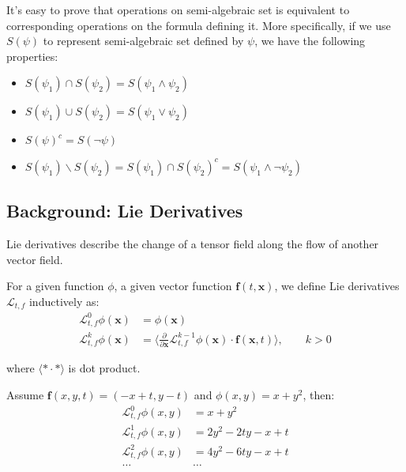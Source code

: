 \documentclass{jssc}
\begin{document}
It's easy to prove that operations on semi-algebraic set is equivalent to corresponding operations on the formula defining it. More specifically, if we use $S(\psi)$ to represent semi-algebraic set defined by $\psi$, we have the following properties:
\begin{itemize}
	\item $S(\psi_1) \cap S(\psi_2) = S(\psi_1 \wedge \psi_2)$
	\item $S(\psi_1) \cup S(\psi_2) = S(\psi_1 \vee \psi_2)$
	\item $S(\psi)^c = S(\neg \psi)$
	\item $S(\psi_1) \backslash S(\psi_2) = S(\psi_1) \cap S(\psi_2)^c = S(\psi_1 \wedge \neg \psi_2)$
\end{itemize}

\subsection{Background: Lie Derivatives}
Lie derivatives describe the change of a tensor field along the flow of another vector field.

\begin{definition}
\label{def:lieDeri}
For a given function $\phi$, a given vector function $\boldsymbol{f}(t, \boldsymbol{x})$, we define Lie derivatives $\mathcal{L}_{t, f}$ inductively as:
\begin{align*}
	\mathcal{L}_{t, f}^0 \phi (\boldsymbol{x}) &= \phi (\boldsymbol{x}) \\
	\mathcal{L}_{t, f}^k \phi (\boldsymbol{x}) &= \langle \frac{\partial}{\partial \boldsymbol{x}} \mathcal{L}_{t, f}^{k-1} \phi (\boldsymbol{x}) \cdot  \boldsymbol{f}(\boldsymbol{x}, t) \rangle,\qquad k>0
\end{align*}

where $\langle * \cdot * \rangle$ is dot product.
\end{definition}

\begin{example}
	Assume $\boldsymbol{f}(x,y,t) = (-x+t,y-t)$ and $\phi (x,y) = x + y^2$, then:
	\begin{align*}
		\mathcal{L}_{t, f}^0 \phi (x, y) &= x + y^2 \\
		\mathcal{L}_{t, f}^1 \phi (x, y) &= 2y^2 - 2ty -x + t \\
		\mathcal{L}_{t, f}^2 \phi (x, y) &= 4y^2 - 6ty -x + t \\
		\dots & \dots
	\end{align*}
\end{example}
\end{document}
